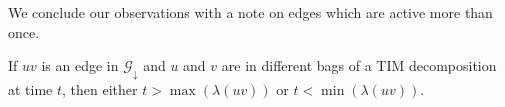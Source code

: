\documentclass[a4paper,UKenglish,cleveref, autoref, thm-restate]{lipics-v2021} %
\begin{document}
\begin{toappendix}
We conclude our observations with a note on edges which are active more than once.

\begin{observation}\label{obs:tim:nonsimple-edge}
    If $uv$ is an edge in $\mathcal{G}_{\downarrow}$ and $u$ and $v$ are in different bags of a TIM decomposition at time $t$, then either $t>\max(\lambda(uv))$ or $t<\min(\lambda(uv))$.
\end{observation}




\end{toappendix}
\end{document}
